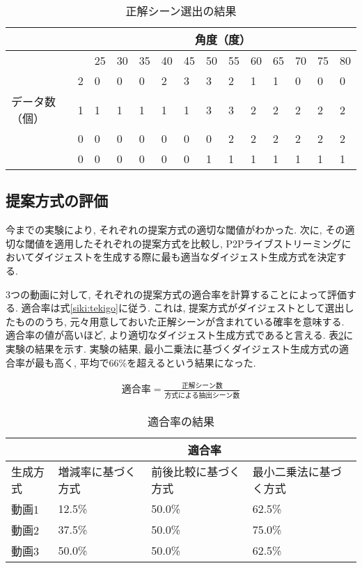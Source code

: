 \begin{table}[h]
  \caption{正解シーン選出の結果}
  \label{tbl:digest3-1}
  \centering
      {\small
        \begin{tabular}{|l|l||l|l|l|l|l|l|l|l|l|l|l|l|} \hline
          & & \multicolumn{12}{|c|}{角度（度）} \\ \hline
          & & 25 & 30 & 35 & 40 & 45 & 50 & 55 & 60 & 65 & 70 & 75 & 80 \\ \hline \hline
          & 2 & 0 & 0 & 0 & 2 & 3 & 3 & 2 & 1 & 1 & 0 & 0 & 0 \\ \cline{2-14}
          データ数（個） & 1 & 1 & 1 & 1 & 1 & 1 & 3 & 3 & 2 & 2 & 2 & 2 & 2 \\ \cline{2-14}
          & 0 & 0 & 0 & 0 & 0 & 0 & 0 & 2 & 2 & 2 & 2 & 2 & 2 \\ \cline{2-14}
          & 0 & 0 & 0 & 0 & 0 & 0 & 1 & 1 & 1 & 1 & 1 & 1 & 1 \\ \cline{2-14}
          \hline
        \end{tabular}
      }
\end{table}

\subsection{提案方式の評価}\label{subsec: eval-digest}
今までの実験により, それぞれの提案方式の適切な閾値がわかった. 次に, その適切な閾値を適用したそれぞれの提案方式を比較し, P2Pライブストリーミングにおいてダイジェストを生成する際に最も適当なダイジェスト生成方式を決定する.

3つの動画に対して, それぞれの提案方式の適合率を計算することによって評価する. 適合率は式\ref{siki:tekigo}に従う. これは, 提案方式がダイジェストとして選出したもののうち, 元々用意しておいた正解シーンが含まれている確率を意味する. 適合率の値が高いほど, より適切なダイジェスト生成方式であると言える. 表\ref{tbl:tekigo}に実験の結果を示す. 実験の結果, 最小二乗法に基づくダイジェスト生成方式の適合率が最も高く, 平均で66\%を超えるという結果になった.

\begin{eqnarray}
  適合率 = \frac{正解シーン数}{方式による抽出シーン数}
  \label{siki:tekigo}
\end{eqnarray}

\begin{table}[h]
  \caption{適合率の結果}
  \label{tbl:tekigo}
  \centering
      {\small
        \begin{tabular}{|l|l|l|l|} \hline
          & \multicolumn{3}{|c|}{適合率} \\ \hline
          生成方式 & 増減率に基づく方式 & 前後比較に基づく方式 & 最小二乗法に基づく方式 \\ \hline
          動画1 & 12.5\% & 50.0\% & 62.5\% \\ \hline
          動画2 & 37.5\% & 50.0\% & 75.0\% \\ \hline
          動画3 & 50.0\% & 50.0\% & 62.5\% \\ \hline
        \end{tabular}
      }
\end{table}

